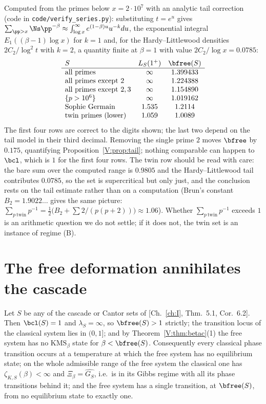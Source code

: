 \begin{remark}\label{V:rem:values}
Computed from the primes below $x=2\cdot10^7$ with an analytic tail correction (code in
\texttt{code/verify\_series.py}): substituting $t=e^u$ gives
$\sum_{\pp>x}\Ns\pp^{-\beta}\approx\int_{\log x}^\infty e^{(1-\beta)u}u^{-k}du$, the
exponential integral $E_1((\beta-1)\log x)$ for $k=1$ and, for the Hardy--Littlewood
densities $2C_2/\log^2t$ with $k=2$, a quantity finite at $\beta=1$ with value
$2C_2/\log x=0.0785$:
\[
\begin{array}{lcc}
S & L_S(1^+) & \bfree(S)\\\hline
\text{all primes} & \infty & 1.399433\\
\text{all primes except }2 & \infty & 1.224388\\
\text{all primes except }2,3 & \infty & 1.154890\\
\{p>10^6\} & \infty & 1.019162\\
\text{Sophie Germain} & 1.535 & 1.2114\\
\text{twin primes (lower)} & 1.059 & 1.0089
\end{array}
\]
The first four rows are correct to the digits shown; the last two depend on the tail
model in their third decimal. Removing the single prime $2$ moves $\bfree$ by $0.175$,
quantifying Proposition~\ref{V:prop:tail}; nothing comparable can happen to $\bcl$, which is
$1$ for the first four rows. The twin row should be read with care: the bare sum over the
computed range is $0.9805$ and the Hardy--Littlewood tail contributes $0.0785$, so the set
is supercritical but only just, and the conclusion rests on the tail estimate rather than
on a computation (Brun's constant $B_2=1.9022\ldots$ gives the same picture:
$\sum_{p\ \mathrm{twin}}p^{-1}=\tfrac12\bigl(B_2+\sum2/(p(p+2))\bigr)\approx1.06$).
Whether $\sum_{p\ \mathrm{twin}}p^{-1}$ exceeds $1$ is an arithmetic question we do not
settle; if it does not, the twin set is an instance of regime (B).
\end{remark}

\section{The free deformation annihilates the cascade}

\begin{theorem}[Annihilation]\label{V:thm:annih}
Let $S$ be any of the cascade or Cantor sets of [Ch.~\ref{ch:I}, Thm.~5.1, Cor.~6.2]. Then
$\bcl(S)=1$ and $\lambda_S=\infty$, so $\bfree(S)>1$ strictly; the transition locus of the
classical system lies in $(0,1]$; and by Theorem~\ref{V:thm:betac}(1) the free system has no
$\mathrm{KMS}_\beta$ state for $\beta<\bfree(S)$. Consequently every classical phase
transition occurs at a temperature at which the free system has no equilibrium state; on the
whole admissible range of the free system the classical one has $\zeta_{K,S}(\beta)<\infty$
and $\Xi_\beta=\widehat{G_S}$, i.e.\ is in its Gibbs regime with all its phase transitions
behind it; and the free system has a single transition, at $\bfree(S)$, from no
equilibrium state to exactly one.
\end{theorem}

